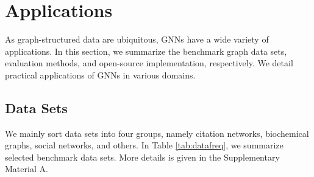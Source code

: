 	
	
	
	\section{Applications}\label{sec:applications}
	As graph-structured data are ubiquitous, GNNs have a wide variety of applications. In this section, we  summarize the benchmark graph data sets, evaluation methods, and open-source implementation, respectively. We detail practical applications of GNNs in various domains.
	
	
	
	\subsection{Data Sets}
    We mainly sort data sets into four groups, namely citation networks, biochemical graphs, social networks, and others.  In Table \ref{tab:datafreq}, we summarize selected benchmark data sets. More details is given in the Supplementary Material A.


